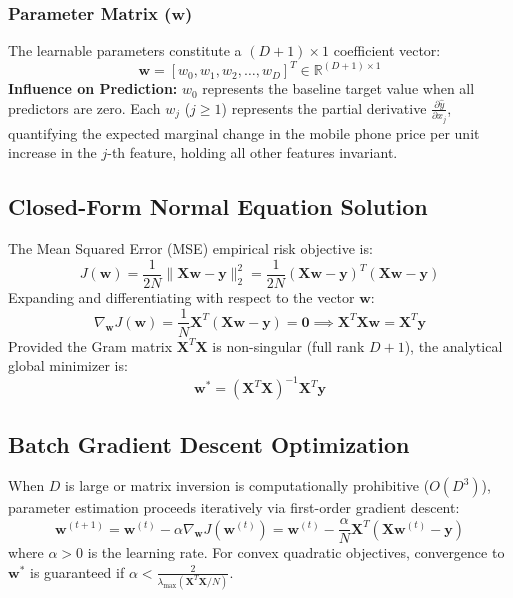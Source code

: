 \documentclass[12pt,a4paper]{article}
\begin{document}
\subsubsection{\texorpdfstring{Parameter Matrix ($\mathbf{w}$)}{Parameter Matrix (w)}}
The learnable parameters constitute a $(D+1) \times 1$ coefficient vector:
\begin{equation}
\mathbf{w} = [w_0, w_1, w_2, \dots, w_D]^T \in \mathbb{R}^{(D+1) \times 1}
\end{equation}
\textbf{Influence on Prediction:} $w_0$ represents the baseline target value when all predictors are zero. Each $w_j$ ($j \ge 1$) represents the partial derivative $\frac{\partial \hat{y}}{\partial x_j}$, quantifying the expected marginal change in the mobile phone price per unit increase in the $j$-th feature, holding all other features invariant.

\subsection{Closed-Form Normal Equation Solution}
The Mean Squared Error (MSE) empirical risk objective is:
\begin{equation}
J(\mathbf{w}) = \frac{1}{2N} \|\mathbf{X}\mathbf{w} - \mathbf{y}\|_2^2 = \frac{1}{2N} (\mathbf{X}\mathbf{w} - \mathbf{y})^T (\mathbf{X}\mathbf{w} - \mathbf{y})
\end{equation}
Expanding and differentiating with respect to the vector $\mathbf{w}$:
\begin{equation}
\nabla_{\mathbf{w}} J(\mathbf{w}) = \frac{1}{N} \mathbf{X}^T (\mathbf{X}\mathbf{w} - \mathbf{y}) = \mathbf{0} \implies \mathbf{X}^T\mathbf{X}\mathbf{w} = \mathbf{X}^T\mathbf{y}
\end{equation}
Provided the Gram matrix $\mathbf{X}^T\mathbf{X}$ is non-singular (full rank $D+1$), the analytical global minimizer is:
\begin{equation}
\mathbf{w}^* = (\mathbf{X}^T\mathbf{X})^{-1} \mathbf{X}^T\mathbf{y}
\end{equation}

\subsection{Batch Gradient Descent Optimization}
When $D$ is large or matrix inversion is computationally prohibitive ($O(D^3)$), parameter estimation proceeds iteratively via first-order gradient descent:
\begin{equation}
\mathbf{w}^{(t+1)} = \mathbf{w}^{(t)} - \alpha \nabla_{\mathbf{w}} J(\mathbf{w}^{(t)}) = \mathbf{w}^{(t)} - \frac{\alpha}{N} \mathbf{X}^T (\mathbf{X}\mathbf{w}^{(t)} - \mathbf{y})
\end{equation}
where $\alpha > 0$ is the learning rate. For convex quadratic objectives, convergence to $\mathbf{w}^*$ is guaranteed if $\alpha < \frac{2}{\lambda_{\max}(\mathbf{X}^T\mathbf{X}/N)}$.
\end{document}
